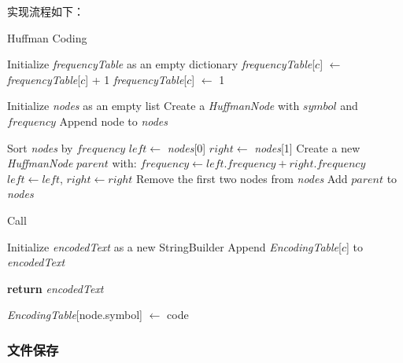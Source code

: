 \documentclass{article}
\begin{document}
实现流程如下：
\FloatBarrier
\begin{algorithm}
\caption{Huffman Coding}
\begin{algorithmic}[1]
    \State Initialize \textit{frequencyTable} as an empty dictionary
            \State \textit{frequencyTable}[$c$] $\gets$ \textit{frequencyTable}[$c$] + 1
        \Else
            \State \textit{frequencyTable}[$c$] $\gets$ 1
        \EndIf
    \EndFor
    
    \State Initialize \textit{nodes} as an empty list
        \State Create a \textit{HuffmanNode} with $symbol$ and $frequency$
        \State Append node to \textit{nodes}
    \EndFor
    
        \State Sort \textit{nodes} by $frequency$
        \State $left \gets$ \textit{nodes}[0]
        \State $right \gets$ \textit{nodes}[1]
        \State Create a new \textit{HuffmanNode} $parent$ with:
            \State \quad $frequency \gets left.frequency + right.frequency$
            \State \quad $left \gets left$, $right \gets right$
        \State Remove the first two nodes from \textit{nodes}
        \State Add $parent$ to \textit{nodes}
    \EndWhile

    \State Call 
    
    \State Initialize \textit{encodedText} as a new StringBuilder
        \State Append \textit{EncodingTable}[$c$] to \textit{encodedText}
    \EndFor

    \State \textbf{return} \textit{encodedText}
\EndProcedure

        \State \textit{EncodingTable}[node.symbol] $\gets$ code
    \Else
        \State {}
        \State {}
    \EndIf
\EndProcedure

\end{algorithmic}
\end{algorithm}
\FloatBarrier

\subsubsection{文件保存}
\end{document}
